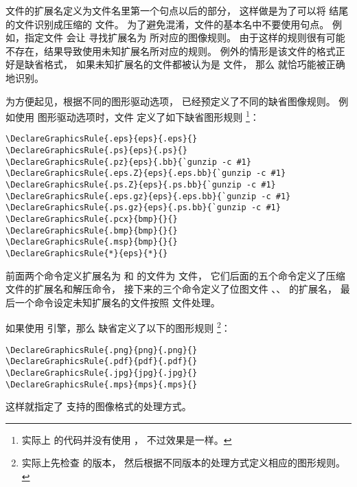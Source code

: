 文件的扩展名定义为文件名里第一个句点以后的部分，
这样做是为了可以将  结尾的文件识别成压缩的 文件。
为了避免混淆，文件的基本名中不要使用句点。
例如，指定文件  会让  寻找扩展名为  所对应的图像规则。
由于这样的规则很有可能不存在，结果导致使用未知扩展名所对应的规则。
例外的情形是该文件的格式正好是缺省格式，
如果未知扩展名的文件都被认为是  文件，
那么  就恰巧能被正确地识别。

为方便起见，根据不同的图形驱动选项，
已经预定义了不同的缺省图像规则。
例如使用  图形驱动选项时，文件  定义了如下缺省图形规则
\footnote{
	实际上  的代码并没有使用 ，
	不过效果是一样。}：
\begin{lstlisting}
\DeclareGraphicsRule{.eps}{eps}{.eps}{}
\DeclareGraphicsRule{.ps}{eps}{.ps}{}
\DeclareGraphicsRule{.pz}{eps}{.bb}{`gunzip -c #1}
\DeclareGraphicsRule{.eps.Z}{eps}{.eps.bb}{`gunzip -c #1}
\DeclareGraphicsRule{.ps.Z}{eps}{.ps.bb}{`gunzip -c #1}
\DeclareGraphicsRule{.eps.gz}{eps}{.eps.bb}{`gunzip -c #1}
\DeclareGraphicsRule{.ps.gz}{eps}{.ps.bb}{`gunzip -c #1}
\DeclareGraphicsRule{.pcx}{bmp}{}{}
\DeclareGraphicsRule{.bmp}{bmp}{}{}
\DeclareGraphicsRule{.msp}{bmp}{}{}
\DeclareGraphicsRule{*}{eps}{*}{}
\end{lstlisting}
前面两个命令定义扩展名为  和  的文件为  文件，
它们后面的五个命令定义了压缩  文件的扩展名和解压命令，
接下来的三个命令定义了位图文件 、、 的扩展名，
最后一个命令设定未知扩展名的文件按照  文件处理。

如果使用 \pdfTeX 引擎，那么  缺省定义了以下的图形规则
\footnote{
	 实际上先检查 \pdfTeX{} 的版本，
	然后根据不同版本的处理方式定义相应的图形规则。}：
\begin{lstlisting}
\DeclareGraphicsRule{.png}{png}{.png}{}
\DeclareGraphicsRule{.pdf}{pdf}{.pdf}{}
\DeclareGraphicsRule{.jpg}{jpg}{.jpg}{}
\DeclareGraphicsRule{.mps}{mps}{.mps}{}
\end{lstlisting}
这样就指定了 \pdfTeX{} 支持的图像格式的处理方式。

\clearpage
\endinput

